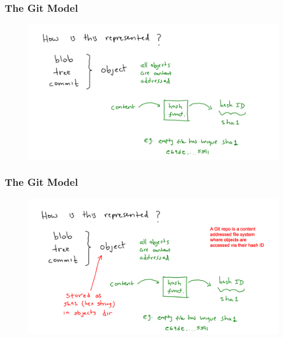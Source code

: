 \documentclass[11pt]{beamer}
\begin{document}
\begin{frame}[fragile]
\frametitle{The Git Model}

\begin{figure}[htp]
 \centering
 \includegraphics[scale=0.2]{git_model_3b.png}
\end{figure}

\end{frame}




\begin{frame}[fragile]
\frametitle{The Git Model}

\begin{figure}[htp]
 \centering
 \includegraphics[scale=0.2]{git_model_3c.png}
\end{figure}

\end{frame}



\end{document}
